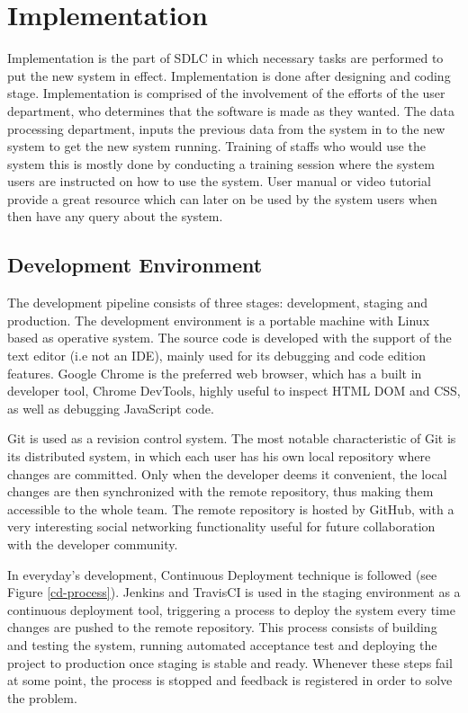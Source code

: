 \chapter{Implementation}
Implementation is the part of SDLC in which necessary tasks are performed to put the new
system in effect.
Implementation is done after designing and coding stage. Implementation is comprised of
the involvement of the efforts of the user department, who determines that the software
is made as they wanted. The data processing department, inputs the previous data from the
system in to the new system to get the new system running. Training of staffs who would use
the system this is mostly done by conducting a training session where the system users are
instructed on how to use the system. User manual or video tutorial provide a great resource
which can later on be used by the system users when then have any query about the
system.



\section{Development Environment}

The development pipeline consists of three stages: development, staging and production. The development environment is a portable machine with Linux based as operative system. The source code is developed with the support of the text editor (i.e not an IDE), mainly used for its debugging and code edition features. Google Chrome is the preferred web browser, which has a built in developer tool, Chrome DevTools, highly useful to inspect HTML DOM and CSS, as well as debugging JavaScript code.

Git is used as a revision control system. The most notable characteristic of Git is its distributed system, in which each user has his own local repository where changes are committed. Only when the developer deems it convenient, the local changes are then synchronized with the remote repository, thus making them accessible to the whole team. The remote repository is hosted by GitHub, with a very interesting social networking functionality useful for future collaboration with the developer community.

In everyday’s development, Continuous Deployment technique is followed (see Figure \ref{cd-process}). Jenkins and TravisCI is used in the staging environment as a continuous deployment tool, triggering a process to deploy the system every time changes are pushed to the remote repository. This process consists of building and testing the system, running automated acceptance test and deploying the project to production once staging is stable and ready. Whenever these steps fail at some point, the process is stopped and feedback is registered in order to solve the problem.

